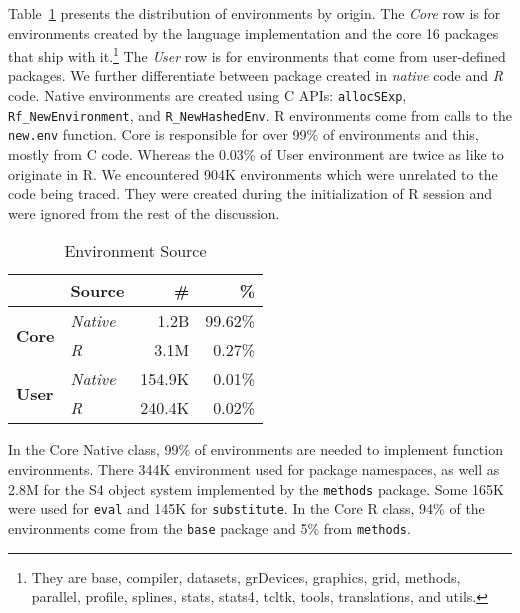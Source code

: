 \documentclass[10pt,review,sigplan,authorversion=true]{acmart}
\newcommand{\code}[1]{\lstinline |#1|\xspace}
\renewcommand{\c}[1]{\lstinline |#1|\xspace}
\newcommand{\newEnv}{\code{new.env}}
\begin{document}
Table~\ref{table:env_source} presents the distribution of environments by
origin. The \emph{Core} row is for environments created by the language
implementation and the core 16 packages that ship with it.\footnote{They are
base, compiler, {datasets}, {grDevices}, {graphics}, {grid}, {methods},
{parallel}, {profile}, {splines}, {stats}, {stats4}, {tcltk}, {tools},
{translations}, and {utils.}} The \emph{User} row is for environments that come
from user-defined packages. We further differentiate between package created in
\emph{native} code and \emph{R} code. Native environments are created using C
APIs: \code{allocSExp}, \\\code{Rf_NewEnvironment}, and \code{R_NewHashedEnv}. R
environments come from calls to the \newEnv function. Core is responsible for
over 99\% of environments and this, mostly from C code. Whereas the 0.03\% of
User environment are twice as like to originate in R. We encountered 904K
environments which were unrelated to the code being traced. They were created
during the initialization of R session and were ignored from the rest of the
discussion.

\begin{table}[!h]\small\centering
  \caption{Environment Source}\label{table:env_source}
  \begin{tabular}{llrr}\toprule
  &\textbf{Source}&\textbf{\#}&\textbf{\%}\\\midrule
\multirow{2}{*}{\textbf{Core}}&\multicolumn{1}{l}{\emph{Native}}&\multicolumn{1}{r}{1.2B}&\multicolumn{1}{r}{99.62\%}\\
                               & \multicolumn{1}{l}{\emph{R}}     & \multicolumn{1}{r}{3.1M} & \multicolumn{1}{r}{0.27\%}\\\midrule
\multirow{2}{*}{\textbf{User}}  & \multicolumn{1}{l}{\emph{Native}} & \multicolumn{1}{r}{154.9K} & \multicolumn{1}{r}{0.01\%}\\
                                & \multicolumn{1}{l}{\emph{R}}      & \multicolumn{1}{r}{240.4K} & \multicolumn{1}{r}{0.02\%}\\\bottomrule
  \end{tabular}
\end{table}

In the Core Native class, 99\% of environments are needed to implement function
environments. There 344K environment used for package namespaces, as well as
2.8M for the S4 object system implemented by the \code{methods} package. Some
165K were used for \c{eval} and 145K for \c{substitute}. In the Core R class,
94\% of the environments come from the \c{base} package and 5\% from
\code{methods}.
\end{document}
